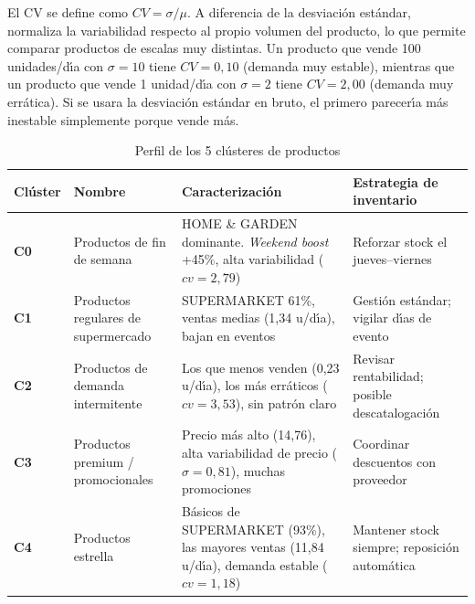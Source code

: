 \documentclass[12pt, a4paper, oneside]{report}
\begin{document}
\begin{tcolorbox}[insightbox, title={?`Por qu\'e el Coeficiente de Variaci\'on y no la desviaci\'on est\'andar?}]
El CV se define como $CV = \sigma / \mu$. A diferencia de la desviaci\'on est\'andar, normaliza la variabilidad respecto al propio volumen del producto, lo que permite comparar productos de escalas muy distintas. Un producto que vende 100 unidades/d\'{\i}a con $\sigma=10$ tiene $CV=0{,}10$ (demanda muy estable), mientras que un producto que vende 1 unidad/d\'{\i}a con $\sigma=2$ tiene $CV=2{,}00$ (demanda muy err\'atica). Si se usara la desviaci\'on est\'andar en bruto, el primero parecer\'{\i}a m\'as inestable simplemente porque vende m\'as.
\end{tcolorbox}

\begin{table}[htbp]
  \centering
  \caption{Perfil de los 5 cl\'usteres de productos}
  \label{tab:clusters_productos}
  \begin{tabularx}{\textwidth}{C{1.1cm} L{3.6cm} L{4.5cm} X}
    \toprule
    {\color{white}\textbf{Cl\'uster}} &
    {\color{white}\textbf{Nombre}} &
    {\color{white}\textbf{Caracterizaci\'on}} &
    {\color{white}\textbf{Estrategia de inventario}} \\
    \midrule
    \textbf{C0} & Productos de fin de semana &
    HOME \& GARDEN dominante. \textit{Weekend boost} +45\%, alta variabilidad ($cv=2{,}79$) &
    Reforzar stock el jueves--viernes \\
    \textbf{C1} & Productos regulares de supermercado &
    SUPERMARKET 61\%, ventas medias (1,34 u/d\'{\i}a), bajan en eventos &
    Gesti\'on est\'andar; vigilar d\'{\i}as de evento \\
    \textbf{C2} & Productos de demanda intermitente &
    Los que menos venden (0,23 u/d\'{\i}a), los m\'as err\'aticos ($cv=3{,}53$), sin patr\'on claro &
    Revisar rentabilidad; posible descatalogaci\'on \\
    \textbf{C3} & Productos premium / promocionales &
    Precio m\'as alto (14,76\texteuro{}), alta variabilidad de precio ($\sigma=0{,}81$), muchas promociones &
    Coordinar descuentos con proveedor \\
    \textbf{C4} & Productos estrella &
    B\'asicos de SUPERMARKET (93\%), las mayores ventas (11,84 u/d\'{\i}a), demanda estable ($cv=1{,}18$) &
    Mantener stock siempre; reposici\'on autom\'atica \\
    \bottomrule
  \end{tabularx}
\end{table}
\end{document}
